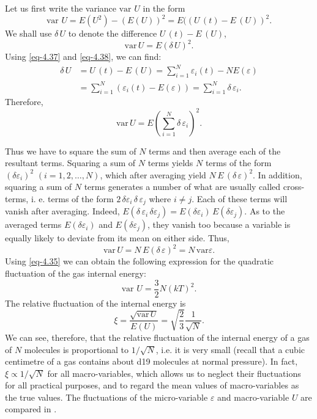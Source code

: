 Let us first write the variance $\textrm{var} \,\, U$ in the form 
\begin{equation*}%
\textrm{var} \,\, U = E(U^{2}) - (E(U))^{2} = E((U\,(t)- E\,(U))^{2}. 
\end{equation*}
We shall use $\delta \, U$ to denote the difference $U \,(t) - E \, (U)$,
\begin{equation}%
\textrm{var} \, U = E(\delta \, U)^{2}.
\label{eq-4.39}
\end{equation}
Using \eqref{eq-4.37} and \eqref{eq-4.38}, we can find:
\begin{align*}
\delta \,U & = U \, (t) - E \,(U)  = \sum_{i=1}^{N} \varepsilon_{i} (t) - N E (\varepsilon)\\
& = \sum_{i=1}^{N} (\varepsilon_{i} (t) - E (\varepsilon) ) = \sum_{i=1}^{N} \delta \, \varepsilon_{i}.
\end{align*}
Therefore,
\begin{equation}%
\textrm{var} \, U = E \left( \sum_{i=1}^{N} \delta \, \varepsilon_{i} \right)^{2}.
\label{eq-4.40}
\end{equation}

Thus we have to square the sum of $N$ terms and then average each of the resultant terms. Squaring a sum of $N$ terms yields $N$ terms of the form $(\delta \varepsilon_{i})^{2} \,\, (i = 1, 2,\ldots, N)$, which after averaging yield $N\,E\,(\delta \,\varepsilon)^{2}$. In addition, squaring a sum of $N$ terms generates a number of what are usually called cross-terms, i. e. terms of the form $2 \, \delta \varepsilon_{i}  \, \delta \, \varepsilon_{j} $ where $i \neq j$. Each of these terms will vanish after averaging. Indeed,	$E (\delta \,\varepsilon_{i}  \, \delta  \varepsilon_{j}) = E(\delta \varepsilon_{i})  \, E(\delta  \varepsilon_{j})$. As to the averaged terms $ E(\delta \varepsilon_{i}) $ and $ E(\delta \varepsilon_{j}) $, they vanish too because a variable is equally likely to deviate from its mean on
either side. Thus, 
\begin{equation}%
\textrm{var} \, U =  N \, E ( \delta \, \varepsilon)^{2} = N \, \textrm{var} \varepsilon.
\label{eq-4.41}
\end{equation}
Using \eqref{eq-4.35} we can obtain the following expression for the quadratic fluctuation of the gas internal energy:
\begin{equation}%
\text{var} \,\, U= \frac{3}{2} N(kT)^{2}.
\label{eq-4.42}
\end{equation}
The relative fluctuation of the internal energy is
\begin{equation}%
\xi = \frac{\sqrt{\text{var} \, U}}{E(U)} = \sqrt{\frac{2}{3}} \frac{1}{\sqrt{N}}.
\label{eq-4.43}
\end{equation}
We can see, therefore, that the relative fluctuation of the internal energy of a gas of $N$ molecules is proportional to $1 /\sqrt{N}$, i.e. it is very small (recall that a cubic centimetre of a gas contains about \num{d19} molecules at normal pressure). In fact, $\xi \propto  1 / \sqrt{N}$ for all macro-variables, which allows us to neglect their fluctuations for all practical purposes, and to regard the mean values of macro-variables as the true values. The fluctuations of the micro-variable	$\varepsilon$ and	macro-variable $U$ are compared	 in .

